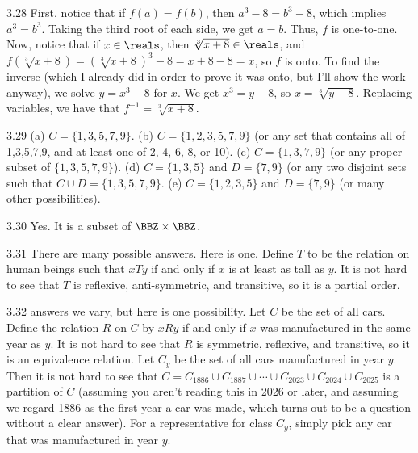 \begin{RequAnswer}{3.28}
First, notice that if $f(a)=f(b)$, then $a^3-8=b^3-8$,
which implies $a^3=b^3$. Taking the third root of each side,
we get $a=b$. Thus, $f$ is one-to-one.
Now, notice that if $x\in\reals$, then $\sqrt[3]{x+8}\in \reals$,
and $f\left(\sqrt[3]{x+8}\right)=\left(\sqrt[3]{x+8}\right)^3-8=x+8-8=x$,
so $f$ is onto.
To find the inverse (which I already did in order to prove it was
onto, but I'll show the work anyway),
we solve $y=x^3-8$ for $x$. We get $x^3=y+8$, so
$x=\sqrt[3]{y+8}$. Replacing variables, we have
that $f^{-1}=\sqrt[3]{x+8}$.
\end{RequAnswer}
\begin{RequAnswer}{3.29}
(a) $C=\{1,3,5,7,9\}$.
(b) $C=\{1,2,3,5,7,9\}$ (or any set that contains all of 1,3,5,7,9, and at least one of 2, 4, 6, 8, or 10).
(c) $C=\{1,3,7,9\}$ (or any proper subset of $\{1,3,5,7,9\}$).
(d) $C=\{1,3,5\}$ and $D=\{7,9\}$ (or any two disjoint sets such that $C\cup D=\{1,3,5,7,9\}$.
(e) $C=\{1,2,3,5\}$ and $D=\{7,9\}$ (or many other possibilities).
\end{RequAnswer}
\begin{RequAnswer}{3.30}
Yes. It is a subset of $\BBZ\times\BBZ$.
\end{RequAnswer}
\begin{RequAnswer}{3.31}
There are many possible answers. Here is one.
Define $T$ to be the relation on human beings such that $x T y$ if and only if $x$ is at least as tall as $y$.
It is not hard to see that $T$ is reflexive, anti-symmetric, and transitive, so it is a partial order.
\end{RequAnswer}
\begin{RequAnswer}{3.32}
answers we vary, but here is one possibility.
Let $C$ be the set of all cars.
Define the relation $R$ on $C$ by $x R y$ if and only if $x$ was manufactured in the same year as $y$.
It is not hard to see that $R$ is symmetric, reflexive, and transitive, so it is an equivalence relation.
Let $C_y$ be the set of all cars manufactured in year $y$.
Then it is not hard to see that $C=C_{1886}\cup C_{1887}\cup\cdots\cup C_{2023}\cup C_{2024}\cup C_{2025}$
is a partition of $C$ (assuming you aren't reading this in 2026 or later, and assuming we regard 1886 as the first year
a car was made, which turns out to be a question without a clear answer).
For a representative for class $C_y$, simply pick any car that was manufactured in year $y$.
\end{RequAnswer}
